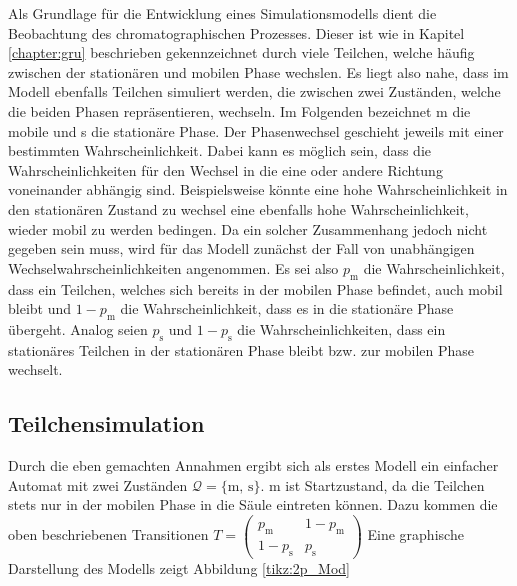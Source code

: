 Als Grundlage für die Entwicklung eines Simulationsmodells dient die Beobachtung des chromatographischen Prozesses. Dieser ist wie in Kapitel \ref{chapter:gru} beschrieben gekennzeichnet durch viele Teilchen, welche häufig zwischen der stationären und mobilen Phase wechslen. Es liegt also nahe, dass im Modell ebenfalls Teilchen simuliert werden, die zwischen zwei Zuständen, welche die beiden Phasen repräsentieren, wechseln. Im Folgenden bezeichnet m die mobile und s die stationäre Phase. Der Phasenwechsel geschieht jeweils mit einer bestimmten Wahrscheinlichkeit. Dabei kann es möglich sein, dass die Wahrscheinlichkeiten für den Wechsel in die eine oder andere Richtung voneinander abhängig sind. Beispielsweise könnte eine hohe Wahrscheinlichkeit in den stationären Zustand zu wechsel eine ebenfalls hohe Wahrscheinlichkeit, wieder mobil zu werden bedingen. Da ein solcher Zusammenhang jedoch nicht gegeben sein muss, wird für das Modell zunächst der Fall von unabhängigen Wechselwahrscheinlichkeiten angenommen. Es sei also $p_{\text {m}}$ die Wahrscheinlichkeit, dass ein Teilchen, welches sich bereits in der mobilen Phase befindet, auch mobil bleibt und $1-p_{\text {m}}$ die Wahrscheinlichkeit, dass es in die stationäre Phase übergeht. Analog seien $p_{\text {s}}$ und $1-p_{\text {s}}$ die Wahrscheinlichkeiten, dass ein stationäres Teilchen in der stationären Phase bleibt bzw. zur mobilen Phase wechselt. 

\subsection{Teilchensimulation}
Durch die eben gemachten Annahmen ergibt sich als erstes Modell ein einfacher Automat mit zwei Zuständen $\mathcal{Q} = \{\text{m, s}\}$. m ist Startzustand, da die Teilchen stets nur in der mobilen Phase in die Säule eintreten können. Dazu kommen die oben beschriebenen Transitionen $T= 
\begin{pmatrix}
p_{\text {m}} & 1-p_{\text {m}} \\
1-p_{\text {s}} & p_{\text {s}} 
\end{pmatrix}
$ 
Eine graphische Darstellung des Modells zeigt Abbildung \ref{tikz:2p_Mod} %


